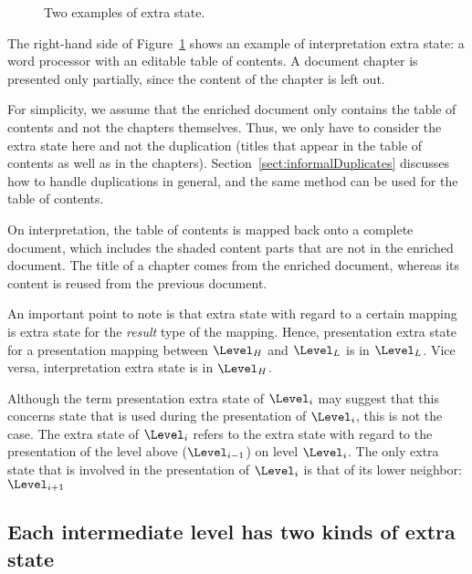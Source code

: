 \begin{figure}
\begin{center}
\begin{center}
\end{center}
\caption{Two examples of extra state.} \label{layerExtraState} 
\end{center}
\end{figure}


The right-hand side of Figure~\ref{layerExtraState} shows an example of interpretation extra state: a word processor with an editable table of contents. A document chapter is presented only partially, since the content of the chapter is left out.

For simplicity, we assume that the enriched document only contains the table of contents and not the chapters themselves. Thus, we only have to consider the extra state here and not the duplication (titles that appear in the table of contents as well as in the chapters). Section~\ref{sect:informalDuplicates} discusses how to handle duplications in general, and the same method can be used for the table of contents.

On interpretation, the table of contents is mapped back onto a complete document, which includes the shaded content parts that are not in the enriched document. The title of a chapter comes from the enriched document, whereas its content is reused from the previous document.



\bc
An important point to note is that extra state with regard to a certain mapping is extra state for the {\em result} type of the mapping. Hence, presentation extra state for a presentation mapping between $\Level_{H}$ and $\Level_{L}$ is in $\Level_{L}$. Vice versa, interpretation extra state is in $\Level_{H}$.
\ec

\bc Although the term presentation extra state of $\Level_i$ may suggest that this concerns state that is used during the presentation of $\Level_i$, this is not the case. The extra state of $\Level_i$ refers to the extra state with regard to the presentation of the level above ($\Level_{i-1}$) on level $\Level_i$. The only extra state that is involved in the presentation of $\Level_i$ is that of its lower neighbor: $\Level_{i+1}$
\ec


%																
\subsection{Each intermediate level has two kinds of extra state} \label{sect:oneLevelDoubleES}

